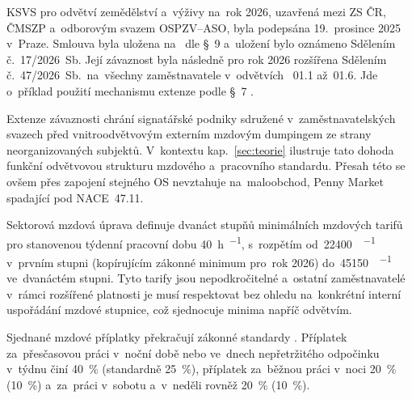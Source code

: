 
\Acf{KSVS} pro odvětví zemědělství a~výživy na~rok 2026, uzavřená mezi \acs{ZS ČR}, \acs{ČMSZP} a~odborovým svazem \acs{OSPZV}--\acs{ASO}, byla podepsána 19.~prosince 2025 v~Praze. Smlouva byla uložena na~ dle \S~9  a~uložení bylo oznámeno Sdělením č.~17/2026~Sb. Její závaznost byla následně pro rok 2026 rozšířena Sdělením č.~47/2026~Sb.~na~všechny zaměstnavatele v~odvětvích ~01.1 až~01.6. Jde o~příklad použití mechanismu extenze podle \S~7 .\par

Extenze závaznosti chrání signatářské podniky sdružené v~zaměstnavatelských svazech před vnitroodvětvovým externím mzdovým dumpingem ze strany neorganizovaných subjektů. V~kontextu kap.~\ref{sec:teorie} ilustruje tato dohoda funkční odvětvovou strukturu mzdového a~pracovního standardu. Přesah této  se ovšem přes zapojení stejného \acs{OS} nevztahuje na~maloobchod, Penny Market spadající pod \ac{NACE}~47.11.\par

Sektorová mzdová úprava definuje dvanáct stupňů minimálních mzdových tarifů pro stanovenou týdenní pracovní dobu \SI{40}{\hour\per\week}, s~rozpětím od~\SI{22400}{\czk\per\month} v~prvním stupni (kopírujícím zákonné minimum pro~rok 2026) do~\SI{45150}{\czk\per\month} ve~dvanáctém stupni. Tyto tarify jsou nepodkročitelné a~ostatní zaměstnavatelé v~rámci rozšířené platnosti je musí respektovat bez ohledu na~konkrétní interní uspořádání mzdové stupnice, což sjednocuje minima napříč odvětvím.\par

Sjednané mzdové příplatky překračují zákonné standardy . Příplatek za~přesčasovou práci v~noční době nebo ve~dnech nepřetržitého odpočinku v~týdnu činí \SI{40}{\percent}  (standardně \SI{25}{\percent}), příplatek za~běžnou práci v~noci \SI{20}{\percent}  (\SI{10}{\percent}) a~za~práci v~sobotu a~v~neděli rovněž \SI{20}{\percent}  (\SI{10}{\percent}).\par


